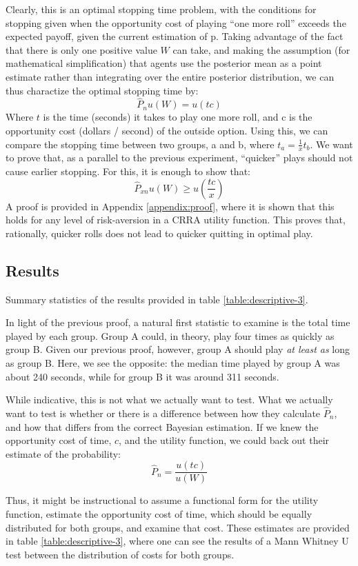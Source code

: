 \documentclass[a4paper,12pt]{article}
\begin{document}
Clearly, this is an optimal stopping time problem, with the conditions for stopping given when the opportunity cost of playing ``one more roll'' exceeds the expected payoff, given the current estimation of p. Taking advantage of the fact that there is only one positive value $W$ can take, and making the assumption (for mathematical simplification) that agents use the posterior mean as a point estimate rather than integrating over the entire posterior distribution, we can thus charactize the optimal stopping time by:
$$
\hat{P}_n u(W) = u(tc)
$$
Where $t$ is the time (seconds) it takes to play one more roll, and c is the opportunity cost (dollars / second) of the outside option. Using this, we can compare the stopping time between two groups, a and b, where $t_a = \frac{1}{x}t_b$. We want to prove that, as a parallel to the previous experiment, ``quicker'' plays should not cause earlier stopping. For this, it is enough to show that:
$$
\hat{P}_{xn}u(W) \geq u \left( \frac{tc}{x} \right)
$$
A proof is provided in Appendix \ref{appendix:proof}, where it is shown that this holds for any level of risk-aversion in a CRRA utility function. This proves that, rationally, quicker rolls does not lead to quicker quitting in optimal play.

\subsection{ Results }

Summary statistics of the results provided in table \ref{table:descriptive-3}.

In light of the previous proof, a natural first statistic to examine is the total time played by each group. Group A could, in theory, play four times as quickly as group B. Given our previous proof, however, group A should play \textit{ at least as } long as group B. Here, we see the opposite: the median time played by group A was about 240 seconds, while for group B it was around 311 seconds.

While indicative, this is not what we actually want to test. What we actually want to test is whether or there is a difference between how they calculate $\hat{P}_n$, and how that differs from the correct Bayesian estimation. If we knew the opportunity cost of time, $c$, and the utility function, we could back out their estimate of the probability:
$$
\hat{P}_n = \frac{u(tc)}{u(W)}
$$

Thus, it might be instructional to assume a functional form for the utility function, estimate the opportunity cost of time, which should be equally distributed for both groups, and examine that cost. These estimates are provided in table \ref{table:descriptive-3}, where one can see the results of a Mann Whitney U test between the distribution of costs for both groups.
\end{document}
